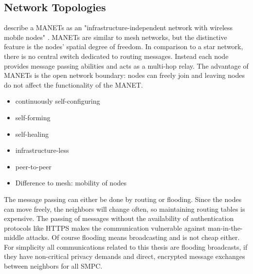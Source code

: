 	\subsection{Network Topologies}
	\label{Network Topologies}
	
	\textcite{Dorri2015} describe a \gls{MANET}s as an "infrastructure-independent network with wireless mobile nodes" \autocite[p. 15]{Dorri2015}. \gls{MANET}s are similar to mesh networks, but the distinctive feature is the nodes' spatial degree of freedom. In comparison to a star network, there is no central switch dedicated to routing messages. Instead each node provides message passing abilities and acts as a multi-hop relay.
	The advantage of \gls{MANET}s is the open network boundary: nodes can freely join and leaving nodes do not affect the functionality of the \gls{MANET}.
	
	\begin{itemize}  
		\item continuously self-configuring
		\item self-forming
		\item self-healing
		\item infrastructure-less
		\item peer-to-peer
		\item Difference to mesh: mobility of nodes
	\end{itemize}
			
	The message passing can either be done by routing or flooding. Since the nodes can move freely, the neighbors will change often, so maintaining routing tables is expensive. The passing of messages without the availability of authentication protocols like \gls{HTTPS} makes the communication vulnerable against man-in-the-middle attacks. Of course flooding means broadcasting and is not cheap either. For simplicity all communications related to this thesis are flooding broadcasts, if they have non-critical privacy demands and direct, encrypted message exchanges between neighbors for all \gls{SMPC}.
	
		
